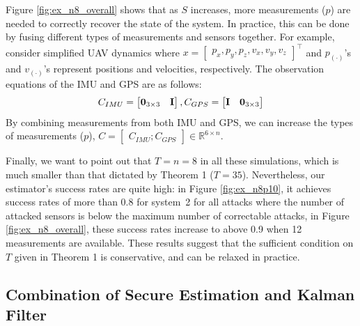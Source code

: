 \documentclass[../../thesis.tex]{subfiles}
\begin{document}
Figure \ref{fig:ex_n8_overall} shows that as $S$ increases, more measurements ($p$) are needed to correctly recover the state of the system. In practice, this can be done by fusing different types of measurements and sensors together. For example, consider simplified UAV dynamics where $ x = \begin{bmatrix} p_x, p_y, p_z, v_x, v_y, v_z \end{bmatrix}^\top$ and $p_{(\cdot)}$'s and $v_{(\cdot)}$'s represent positions and velocities, respectively. The observation equations of the IMU and GPS are as follows:
\begin{equation}
C_{IMU} =\begin{bmatrix} {\bf 0}_{3\times 3} & {\bf I} \end{bmatrix}, C_{GPS} = \begin{bmatrix} {\bf I} & {\bf 0}_{3\times 3} \end{bmatrix} \nonumber
\end{equation}
By combining measurements from both IMU and GPS, we can increase the types of measurements ($p$), $C = \begin{bmatrix} C_{IMU} ; C_{GPS}\end{bmatrix} \in \mathbb{R}^{6 \times n}$.

Finally, we want to point out that $T=n=8$ in all these simulations, which is much smaller than that dictated by Theorem 1 ($T=35$).
Nevertheless, our estimator's success rates are quite high: in Figure \ref{fig:ex_n8p10}, it achieves success rates of more than 0.8 for system~2 for all attacks where the number of attacked sensors is below the maximum number of correctable attacks, in Figure \ref{fig:ex_n8_overall}, these success rates increase to above 0.9 when 12 measurements are available. These results suggest that the sufficient condition on $T$ given in Theorem 1 is conservative, and can be relaxed in practice.

\subsection{Combination of Secure Estimation and Kalman Filter}\label{sec:estimation}
\end{document}
